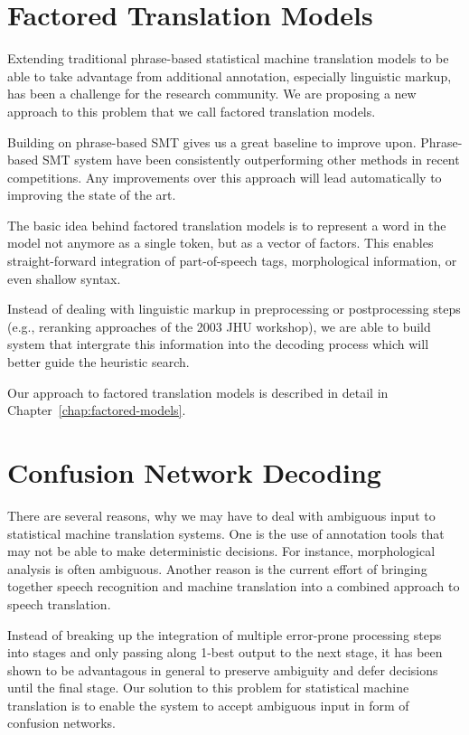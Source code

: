 \documentclass[11pt]{report}
\theoremstyle{plain}
\begin{document}
\section{Factored Translation Models}
Extending traditional phrase-based statistical machine translation models to be able to take advantage from additional annotation, especially linguistic markup, has been a challenge for the research community. We are proposing a new approach to this problem that we call factored translation models.

Building on phrase-based SMT gives us a great baseline to improve upon. Phrase-based SMT system have been consistently outperforming other methods in recent competitions. Any improvements over this approach will lead automatically to improving the state of the art.

The basic idea behind factored translation models is to represent a word in the model not anymore as a single token, but as a vector of factors. This enables straight-forward integration of part-of-speech tags, morphological information, or even shallow syntax.

Instead of dealing with linguistic markup in preprocessing or postprocessing steps (e.g., reranking approaches of the 2003 JHU workshop), we are able to build system that intergrate this information into the decoding process which will better guide the heuristic search.

Our approach to factored translation models is described in detail in Chapter~\ref{chap:factored-models}.

\section{Confusion Network Decoding}
There are several reasons, why we may have to deal with ambiguous input to statistical machine translation systems. One is the use of annotation tools that may not be able to make deterministic decisions. For instance, morphological analysis is often ambiguous. Another reason is the current effort of bringing together speech recognition and machine translation into a combined approach to speech translation.

Instead of breaking up the integration of multiple error-prone processing steps into stages and only passing along 1-best output to the next stage, it has been shown to be advantagous in general to preserve ambiguity and defer decisions until the final stage. Our solution to this problem for statistical machine translation is to enable the system to accept ambiguous input in form of confusion networks.
\end{document}
